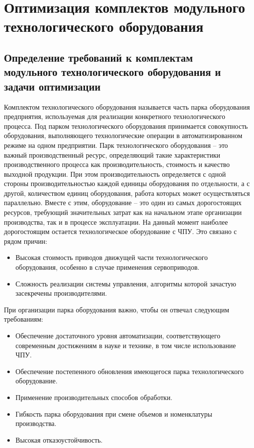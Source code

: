 \section{Оптимизация комплектов модульного технологического оборудования}
	 
\subsection{Определение требований к комплектам модульного технологического оборудования и задачи оптимизации}

Комплектом технологического оборудования называется часть парка оборудования предприятия, используемая для реализации конкретного технологического процесса. Под парком технологического оборудования принимается совокупность оборудования, выполняющего технологические операции в автоматизированном режиме на одном предприятии. Парк технологического оборудования -- это важный производственный ресурс, определяющий такие характеристики производственного процесса как производительность, стоимость и качество выходной продукции. При этом производительность определяется с одной стороны производительностью каждой единицы оборудования по отдельности, а с другой, количеством единиц оборудования, работа которых может осуществляться параллельно.  Вместе с этим, оборудование -- это один из самых дорогостоящих ресурсов, требующий значительных затрат как на начальном этапе организации производства, так и в процессе эксплуатации. На данный момент наиболее дорогостоящим остается технологическое оборудование с ЧПУ. Это связано с рядом причин:

\begin{itemize}
	\item Высокая стоимость приводов движущей части технологического оборудования, особенно в случае применения сервоприводов.
	\item Сложность реализации системы управления, алгоритмы которой зачастую засекречены производителями.
\end{itemize}

При организации парка оборудования важно, чтобы он отвечал следующим требованиям:

\begin{itemize}
	\item Обеспечение достаточного уровня автоматизации, соответствующего современным достижениям в науке и технике, в том числе использование ЧПУ.
	\item Обеспечение постепенного обновления имеющегося парка технологического оборудование.
	\item Применение производительных способов обработки.
	\item Гибкость парка оборудования при смене объемов и номенклатуры производства.
	\item Высокая отказоустойчивость.
\end{itemize}

